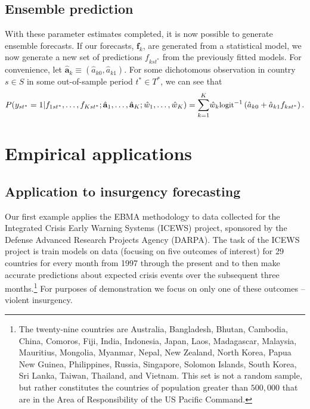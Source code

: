 \documentclass[pdftex,12pt,fullpage,oneside]{amsart}
\begin{document}
\subsection{Ensemble prediction}

With these parameter estimates completed, it is now possible to
generate ensemble forecasts. If our forecasts, $\mathbf{f}_k$, are
generated from a statistical model, we now generate a new set of
predictions $f_{kst^\ast}$ from the previously fitted models. For
convenience, let $\hat{\mathbf{a}}_k \equiv (\hat{a}_{k0},
\hat{a}_{k1})$. For some dichotomous observation in country $s\in S$
in some out-of-sample period $t^\ast\in T^\ast$, we can see that
\begin{equation}
\label{nothing}
{\small
P(y_{st^*} = 1 | f_{1st^\ast}, \ldots, f_{Kst^\ast} ;  \hat{\mathbf{a}}_1,
 \ldots, \hat{\mathbf{a}}_K ; \hat{w}_1, \ldots, \hat{w}_K) =
 \overset{K}{\underset{k=1}{\sum}} \hat{w}_k
 \mbox{logit}^{-1}\left(\hat{a}_{k0} +  \hat{a}_{k1}f_{kst^\ast}\right).}
\end{equation}


\section{Empirical applications}

\subsection{Application to insurgency forecasting}

Our first example applies the EBMA methodology to data
collected for the Integrated Crisis Early Warning Systems (ICEWS)
project, sponsored by the Defense Advanced Research Projects Agency
(DARPA).  The task of the ICEWS project is train models on data
(focusing on five outcomes of interest) for 29 countries for every month from 1997
through the present and to then make accurate predictions about
expected crisis events over the subsequent three months.\footnote{The
  twenty-nine countries are Australia, Bangladesh, Bhutan, Cambodia,
  China, Comoros, Fiji, India, Indonesia, Japan, Laos, Madagascar,
  Malaysia, Mauritius, Mongolia, Myanmar, Nepal, New Zealand, North
  Korea, Papua New Guinea, Philippines, Russia, Singapore, Solomon
  Islands, South Korea, Sri Lanka, Taiwan, Thailand, and Vietnam. This
  set is not a random sample, but rather constitutes the countries of
  population greater than $500,000$ that are in the Area of
  Responsibility of the US Pacific Command.}  For purposes of
demonstration we focus on only one of these outcomes -- violent
insurgency.
\end{document}
